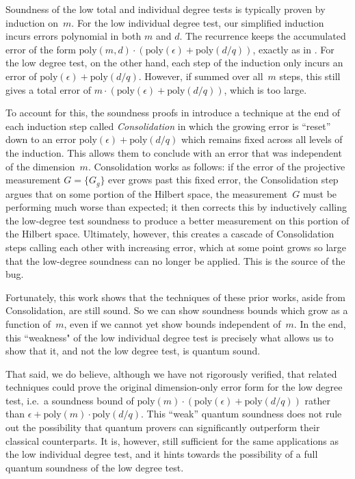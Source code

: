 \documentclass[11pt]{article}
\theoremstyle{definition}
\newcommand{\poly}{\mathrm{poly}}
\newcommand{\eps}{\epsilon}
\begin{document}
Soundness of the low total and individual degree tests
is typically proven by induction on~$m$.
For the low individual degree test,
our simplified induction incurs errors polynomial in both $m$ and $d$.
The recurrence keeps the accumulated error of the form
$\poly(m,d)\cdot(\poly(\eps)+\poly(d/q))$,
exactly as in .
For the low degree test,
on the other hand, each step of the induction only incurs an error of $\poly(\eps) + \poly(d/q)$.
However, if summed over all~$m$ steps,
this still gives a total error of $m \cdot (\poly(\eps) + \poly(d/q))$,
which is too large.

To account for this,
the soundness proofs in \cite{Vid16, NV18b}
introduce a technique at the end of each induction step
called \emph{Consolidation}
in which the growing error is ``reset''
down to an error $\poly(\eps) + \poly(d/q)$
which remains fixed across all levels of the induction.
This allows them to conclude with an error that was independent of the dimension~$m$.
Consolidation works as follows:
if the error of the projective measurement $G = \{G_g\}$
ever grows past this fixed error, the Consolidation step argues that on some portion of the Hilbert space,
the measurement~$G$ must be performing much worse than expected;
it then corrects this by inductively calling the low-degree test soundness to produce a better measurement on this portion of the Hilbert space.
Ultimately, however, this creates a cascade of Consolidation steps calling each other with increasing error,
which at some point grows so large that the low-degree soundness can no longer be applied.
This is the source of the bug.

Fortunately, this work shows that the techniques of these prior works,
aside from Consolidation,
are still sound.
So we can show soundness bounds which grow as a function of~$m$,
even if we cannot yet show bounds independent of~$m$.
In the end, this ``weakness" of the low individual degree test
is precisely what allows us to show that it, and not the low degree test, is quantum sound.

That said, we do believe, although we have not rigorously verified,
that related techniques could prove the original dimension-only
error form for the low degree test,
i.e.\ a soundness bound of $\poly(m) \cdot (\poly(\eps) + \poly(d/q))$ rather than $\eps + \poly(m) \cdot \poly(d/q)$.
This ``weak'' quantum soundness does not rule out the possibility that quantum provers can significantly outperform their classical counterparts.
It is, however, still sufficient for the same applications as the low individual degree test,
and it hints towards the possibility of a full quantum soundness of the low degree test.
\end{document}

